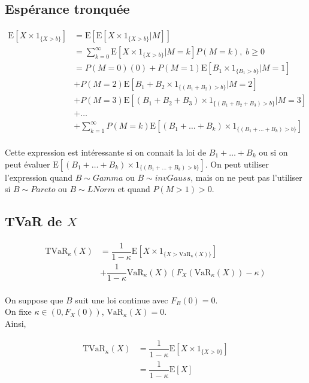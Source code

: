 \subsection{Espérance tronquée}\label{esperance-tronquee}

\begin{align*}
\text{E}\left [X \times 1_{\{X>b\}}\right ]& =\text{E}\left [\text{E}\left [X \times 1_{\{X>b\}}|M\right ]\right ]\\
& =\sum^\infty_{k=0} \text{E}\left [X \times  1_{\{X>b\}}|M=k\right ]P(M=k),\;b\geq 0\\
& =P(M=0)(0)+P(M=1)\text{E}\left [B_1 \times   1_{\{B_1>b\}}|M=1\right ]\\
& +P(M=2)\text{E}\left [B_1+B_2 \times   1_{\{(B_1+B_2)>b\}}|M=2\right ]\\
& +P(M=3)\text{E}\left [(B_1+B_2+B_3) \times   1_{\{(B_1+B_2+B_3)>b\}}|M=3\right ]\\
&+ \dots\\
&+ \sum^\infty_{k=1} P(M=k) \text{E}\left [(B_1+ \dots +B_k) \times  1_{\{(B_1+\dots+B_k)>b\}}\right ]
\end{align*}\\


Cette expression est intéressante si on connait la loi de
\(B_1+ \dots +B_k\) ou si on peut évaluer
\(\text{E}\left [(B_1+ \dots +B_k) \times 1_{\{(B_1+\dots+B_k)>b\}}\right ]\).
On peut utiliser l'expression quand \(B \sim Gamma\) ou
\(B \sim invGauss\), mais on ne peut pas l'utiliser si \(B \sim Pareto\)
ou \(B \sim LNorm\) et quand \(P(M>1)>0\).

\subsection{TVaR de \(X\)}\label{tvar-de-x}

\begin{align*}
\text{TVaR}_\kappa (X)& = \dfrac{1}{1-\kappa}\text{E}\left [X\times 1_{\{X>\text{VaR}_\kappa (X) \}}\right ]\\
& + \dfrac{1}{1-\kappa}\text{VaR}_\kappa (X) \left (F_X(\text{VaR}_\kappa (X) )-\kappa\right )
\end{align*}\\


On suppose que \(B\) suit une loi continue avec \(F_B(0)=0\).\\
On fixe \(\kappa \in (0,F_{X}(0))\), \(\text{VaR}_\kappa (X) =0\).\\
Ainsi,

\begin{align*}
\text{TVaR}_\kappa (X)& =\dfrac{1}{1-\kappa}\text{E}\left [X\times 1_{\{X>0\}}\right ]\\
& =\dfrac{1}{1-\kappa}\text{E}[X]
\end{align*}

